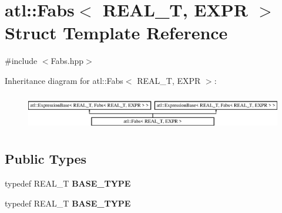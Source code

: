 \hypertarget{structatl_1_1_fabs}{\section{atl\+:\+:Fabs$<$ R\+E\+A\+L\+\_\+\+T, E\+X\+P\+R $>$ Struct Template Reference}
\label{structatl_1_1_fabs}
}


{\ttfamily \#include $<$Fabs.\+hpp$>$}

Inheritance diagram for atl\+:\+:Fabs$<$ R\+E\+A\+L\+\_\+\+T, E\+X\+P\+R $>$\+:\begin{figure}[H]
\begin{center}
\leavevmode
\includegraphics[height=1.609195cm]{structatl_1_1_fabs}
\end{center}
\end{figure}
\subsection*{Public Types}
\begin{DoxyCompactItemize}
\item 
\hypertarget{structatl_1_1_fabs_a011b0506fdd75f1e593b1bb884fc95e2}{typedef R\+E\+A\+L\+\_\+\+T {\bfseries B\+A\+S\+E\+\_\+\+T\+Y\+P\+E}}\label{structatl_1_1_fabs_a011b0506fdd75f1e593b1bb884fc95e2}

\item 
\hypertarget{structatl_1_1_fabs_a011b0506fdd75f1e593b1bb884fc95e2}{typedef R\+E\+A\+L\+\_\+\+T {\bfseries B\+A\+S\+E\+\_\+\+T\+Y\+P\+E}}\label{structatl_1_1_fabs_a011b0506fdd75f1e593b1bb884fc95e2}

\end{DoxyCompactItemize}
